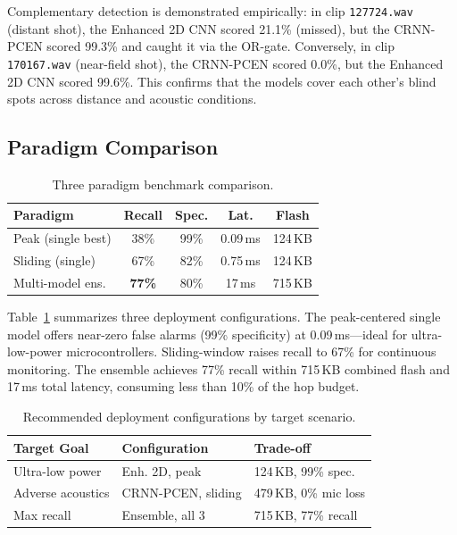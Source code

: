 \documentclass[conference]{IEEEtran}
\begin{document}
Complementary detection is demonstrated empirically: in clip \texttt{127724.wav} (distant shot), the Enhanced 2D CNN scored 21.1\% (missed), but the CRNN-PCEN scored 99.3\% and caught it via the OR-gate. Conversely, in clip \texttt{170167.wav} (near-field shot), the CRNN-PCEN scored 0.0\%, but the Enhanced 2D CNN scored 99.6\%. This confirms that the models cover each other's blind spots across distance and acoustic conditions.

\subsection{Paradigm Comparison}

\begin{table}[!t]
\centering
\caption{Three paradigm benchmark comparison.}
\label{tab:paradigm}
\footnotesize
\begin{tabular}{lcccc}
\toprule
\textbf{Paradigm} & \textbf{Recall} & \textbf{Spec.} & \textbf{Lat.} & \textbf{Flash} \\
\midrule
Peak (single best) & 38\% & 99\% & 0.09\,ms & 124\,KB \\
Sliding (single) & 67\% & 82\% & 0.75\,ms & 124\,KB \\
Multi-model ens. & \textbf{77\%} & 80\% & 17\,ms & 715\,KB \\
\bottomrule
\end{tabular}
\end{table}

Table~\ref{tab:paradigm} summarizes three deployment configurations. The peak-centered single model offers near-zero false alarms (99\% specificity) at 0.09\,ms---ideal for ultra-low-power microcontrollers. Sliding-window raises recall to 67\% for continuous monitoring. The ensemble achieves 77\% recall within 715\,KB combined flash and 17\,ms total latency, consuming less than 10\% of the hop budget.

\begin{table}[!t]
\centering
\caption{Recommended deployment configurations by target scenario.}
\label{tab:deploy}
\footnotesize
\begin{tabular}{lll}
\toprule
\textbf{Target Goal} & \textbf{Configuration} & \textbf{Trade-off} \\
\midrule
Ultra-low power & Enh. 2D, peak & 124\,KB, 99\% spec. \\
Adverse acoustics & CRNN-PCEN, sliding & 479\,KB, 0\% mic loss \\
Max recall & Ensemble, all 3 & 715\,KB, 77\% recall \\
\bottomrule
\end{tabular}
\end{table}
\end{document}

